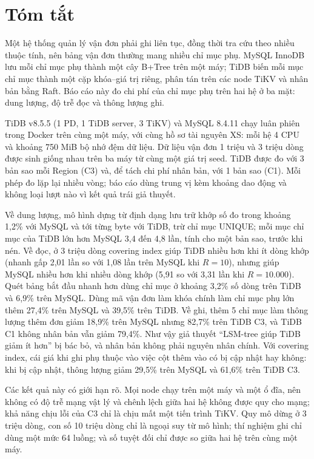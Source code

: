 \section*{Tóm tắt}
Một hệ thống quản lý vận đơn phải ghi liên tục, đồng thời tra cứu theo nhiều thuộc tính, nên bảng vận đơn thường mang nhiều chỉ mục phụ. MySQL InnoDB lưu mỗi chỉ mục phụ thành một cây B+Tree trên một máy; TiDB biến mỗi mục chỉ mục thành một cặp khóa--giá trị riêng, phân tán trên các node TiKV và nhân bản bằng Raft. Báo cáo này đo chi phí của chỉ mục phụ trên hai hệ ở ba mặt: dung lượng, độ trễ đọc và thông lượng ghi.

TiDB v8.5.5 (1 PD, 1 TiDB server, 3 TiKV) và MySQL 8.4.11 chạy luân phiên trong Docker trên cùng một máy, với cùng hồ sơ tài nguyên XS: mỗi hệ 4 CPU và khoảng 750 MiB bộ nhớ đệm dữ liệu. Dữ liệu vận đơn 1 triệu và 3 triệu dòng được sinh giống nhau trên ba máy từ cùng một giá trị seed. TiDB được đo với 3 bản sao mỗi Region (C3) và, để tách chi phí nhân bản, với 1 bản sao (C1). Mỗi phép đo lặp lại nhiều vòng; báo cáo dùng trung vị kèm khoảng dao động và không loại lượt nào vì kết quả trái giả thuyết.

Về dung lượng, mô hình dựng từ định dạng lưu trữ khớp số đo trong khoảng 1,2\% với MySQL và tới từng byte với TiDB, trừ chỉ mục UNIQUE; mỗi mục chỉ mục của TiDB lớn hơn MySQL 3,4 đến 4,8 lần, tính cho một bản sao, trước khi nén. Về đọc, ở 3 triệu dòng covering index giúp TiDB nhiều hơn khi ít dòng khớp (nhanh gấp 2,01 lần so với 1,08 lần trên MySQL khi $R = 10$), nhưng giúp MySQL nhiều hơn khi nhiều dòng khớp (5,91 so với 3,31 lần khi $R = 10.000$). Quét bảng bắt đầu nhanh hơn dùng chỉ mục ở khoảng 3,2\% số dòng trên TiDB và 6,9\% trên MySQL. Dùng mã vận đơn làm khóa chính làm chỉ mục phụ lớn thêm 27,4\% trên MySQL và 39,5\% trên TiDB. Về ghi, thêm 5 chỉ mục làm thông lượng thêm đơn giảm 18,9\% trên MySQL nhưng 82,7\% trên TiDB C3, và TiDB C1 không nhân bản vẫn giảm 79,4\%. Như vậy giả thuyết ``LSM-tree giúp TiDB giảm ít hơn'' bị bác bỏ, và nhân bản không phải nguyên nhân chính. Với covering index, cái giá khi ghi phụ thuộc vào việc cột thêm vào có bị cập nhật hay không: khi  bị cập nhật, thông lượng giảm 29,5\% trên MySQL và 61,6\% trên TiDB C3.

Các kết quả này có giới hạn rõ. Mọi node chạy trên một máy và một ổ đĩa, nên không có độ trễ mạng vật lý và chênh lệch giữa hai hệ không được quy cho mạng; khả năng chịu lỗi của C3 chỉ là chịu mất một tiến trình TiKV. Quy mô dừng ở 3 triệu dòng, con số 10 triệu dòng chỉ là ngoại suy từ mô hình; thí nghiệm ghi chỉ dùng một mức 64 luồng; và số tuyệt đối chỉ được so giữa hai hệ trên cùng một máy.

